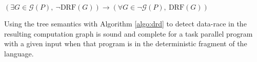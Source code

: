 \begin{corollary}\label{cor:drf}
$(\exists G \in \mathcal{G}( P ),\ \neg\mathrm{DRF}( G )) \rightarrow (\forall G \in \neg\mathcal{G}( P ),\ \mathrm{DRF}( G ))$ 
\end{corollary}

\begin{theorem} \label{thm:strcutured-par-progs}
Using the tree semantics with Algorithm \ref{algo:drd} to detect data-race in the resulting computation graph is sound and complete for a task parallel program with a given input when that program is in the deterministic fragment of the language.
\end{theorem}
